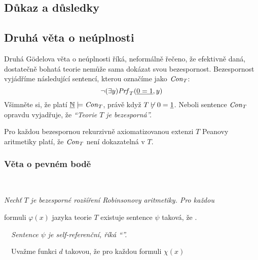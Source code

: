\subsection{Důkaz a důsledky}

\todo

\subsection{Druhá věta o neúplnosti}

Druhá Gödelova věta o neúplnosti říká, neformálně řečeno, že efektivně daná, dostatečně bohatá teorie nemůže sama dokázat svou bezespornost. Bezespornost vyjádříme následující sentencí, kterou označíme jako $\mathit{Con}_T$:
$$
\neg(\exists y)\mathit{Prf}_T(\underline{0=1},y)
$$
Všimněte si, že platí $\underline{\mathbb N}\models\mathit{Con}_T$, právě když $T\not\vdash 0=\underline{1}$. Neboli sentence $\mathit{Con}_T$ opravdu vyjadřuje, že \emph{``Teorie $T$ je bezesporná''.}

\begin{theorem}
Pro každou bezespornou rekurzivně axiomatizovanou extenzi $T$ Peanovy aritmetiky platí, že $\mathit{Con}_T$ není dokazatelná v $T$.    
\end{theorem}

\todo





    
    \subsubsection*{Věta o pevném bodě}
    
    {\bf {}}\ \ {\it Nechť $T$ je bezesporné rozšíření Robinsonovy aritmetiky. Pro každou
    \smallskip
    
    formuli $\varphi(x)$ jazyka teorie $T$ existuje sentence $\psi$ taková, že .}
    \medskip
    
    {\it {}\ \ Sentence $\psi$ je self-referenční, říká \emph{``''.}}
    \medskip
    
    \ \ Uvažme  funkci $d$ takovou, že pro každou formuli $\chi(x)$
    
    
